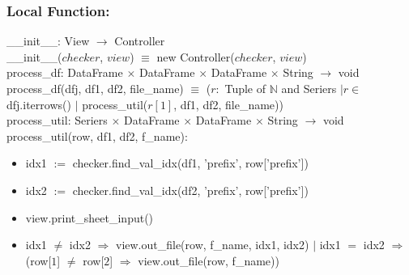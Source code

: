 \documentclass[12pt]{article}
\begin{document}

\subsubsection*{Local Function:}

\_\_init\_\_: View $\rightarrow$ Controller \\
\_\_init\_\_($checker$, $view$) $\equiv$ new Controller($checker$, $view$) \\

\noindent process\_df: DataFrame $\times$ DataFrame $\times$ DataFrame $\times$ String $\rightarrow$ void \\
process\_df(dfj, df1, df2, file\_name) $\equiv$ ($r:$ Tuple of $\mathbb{N}$ and Seriers $| r \in$ dfj.iterrows() $|$ 
process\_util($r[1]$, df1, df2, file\_name)) \\

\noindent process\_util: Seriers $\times$ DataFrame $\times$ DataFrame $\times$ String $\rightarrow$ void \\
process\_util(row, df1, df2, f\_name):
\begin{itemize}[\null]
  \item idx1 $:=$ checker.find\_val\_idx(df1, 'prefix', row['prefix'])
  \item idx2 $:=$ checker.find\_val\_idx(df2, 'prefix', row['prefix'])
  \item view.print\_sheet\_input()
  \item idx1 $\neq$ idx2 $\Rightarrow$ view.out\_file(row, f\_name, idx1, idx2) $|$
  idx1 $=$ idx2 $\Rightarrow$ (row[$1$] $\neq$ row[$2$] $\Rightarrow$ view.out\_file(row, f\_name)) 
\end{itemize}



\end{document}
